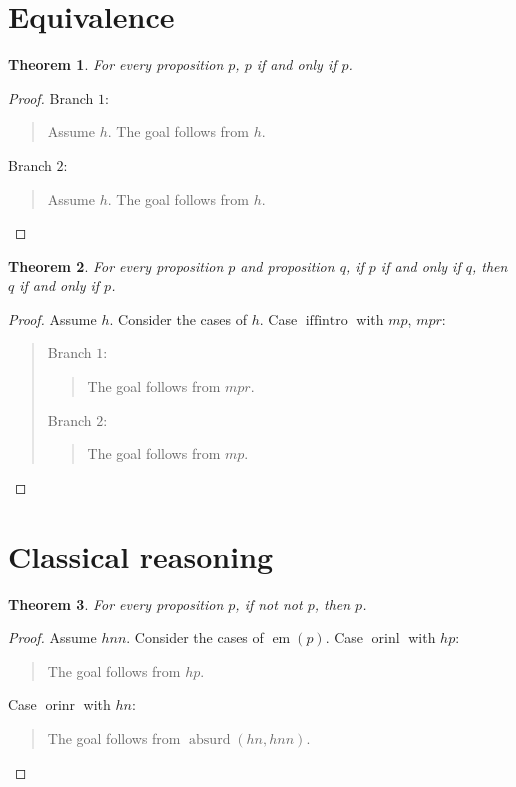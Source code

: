 \documentclass[11pt]{article}
\newtheorem{theorem}{Theorem}[section]
\theoremstyle{definition}
\begin{document}
\section{Equivalence}
\label{ll:main:equivalence}
\begin{theorem}
\label{ll:main:iff-refl}
For every proposition \(p\), \(p\) if and only if \(p\).
\end{theorem}
\begin{proof}
Branch \(1\):
\begin{quote}
Assume \(h\).
The goal follows from \(h\).
\end{quote}
Branch \(2\):
\begin{quote}
Assume \(h\).
The goal follows from \(h\).
\end{quote}
\end{proof}
\begin{theorem}
\label{ll:main:iff-symm}
For every proposition \(p\) and proposition \(q\), if \(p\) if and only if \(q\), then \(q\) if and only if \(p\).
\end{theorem}
\begin{proof}
Assume \(h\).
Consider the cases of \(h\).
Case \(\operatorname{iffintro}\) with \(mp\), \(mpr\):
\begin{quote}
Branch \(1\):
\begin{quote}
The goal follows from \(mpr\).
\end{quote}
Branch \(2\):
\begin{quote}
The goal follows from \(mp\).
\end{quote}
\end{quote}
\end{proof}
\section{Classical reasoning}
\label{ll:main:classical}
\begin{theorem}
\label{ll:main:double-negation-elim}
For every proposition \(p\), if not not \(p\), then \(p\).
\end{theorem}
\begin{proof}
Assume \(hnn\).
Consider the cases of \(\operatorname{em}(p)\).
Case \(\operatorname{orinl}\) with \(hp\):
\begin{quote}
The goal follows from \(hp\).
\end{quote}
Case \(\operatorname{orinr}\) with \(hn\):
\begin{quote}
The goal follows from \(\operatorname{absurd}(hn, hnn)\).
\end{quote}
\end{proof}
\end{document}
